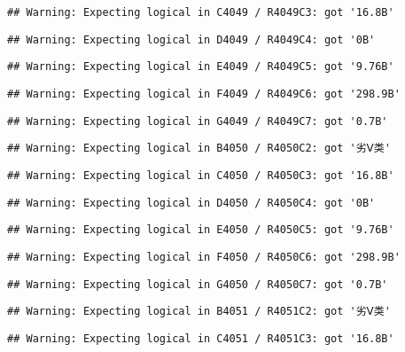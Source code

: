 \documentclass[
]{article}
\begin{document}
\begin{verbatim}
## Warning: Expecting logical in C4049 / R4049C3: got '16.8B'
\end{verbatim}

\begin{verbatim}
## Warning: Expecting logical in D4049 / R4049C4: got '0B'
\end{verbatim}

\begin{verbatim}
## Warning: Expecting logical in E4049 / R4049C5: got '9.76B'
\end{verbatim}

\begin{verbatim}
## Warning: Expecting logical in F4049 / R4049C6: got '298.9B'
\end{verbatim}

\begin{verbatim}
## Warning: Expecting logical in G4049 / R4049C7: got '0.7B'
\end{verbatim}

\begin{verbatim}
## Warning: Expecting logical in B4050 / R4050C2: got '劣Ⅴ类'
\end{verbatim}

\begin{verbatim}
## Warning: Expecting logical in C4050 / R4050C3: got '16.8B'
\end{verbatim}

\begin{verbatim}
## Warning: Expecting logical in D4050 / R4050C4: got '0B'
\end{verbatim}

\begin{verbatim}
## Warning: Expecting logical in E4050 / R4050C5: got '9.76B'
\end{verbatim}

\begin{verbatim}
## Warning: Expecting logical in F4050 / R4050C6: got '298.9B'
\end{verbatim}

\begin{verbatim}
## Warning: Expecting logical in G4050 / R4050C7: got '0.7B'
\end{verbatim}

\begin{verbatim}
## Warning: Expecting logical in B4051 / R4051C2: got '劣Ⅴ类'
\end{verbatim}

\begin{verbatim}
## Warning: Expecting logical in C4051 / R4051C3: got '16.8B'
\end{verbatim}
\end{document}
